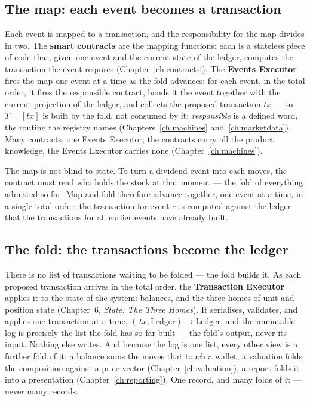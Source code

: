 \documentclass[11pt,a4paper]{article}
\begin{document}
\subsection{The map: each event becomes a transaction}

Each event is mapped to a transaction, and the responsibility for the map divides in two.
The \textbf{smart contracts} are the mapping functions: each is a stateless piece of code
that, given one event and the current state of the ledger, computes the transaction the
event requires (Chapter~\ref{ch:contracts}). The \textbf{Events Executor} fires the map
one event at a time as the fold advances: for each event, in the total order, it fires the
responsible contract, hands it the event together with the current projection of the
ledger, and collects the proposed transaction $tx$ --- so $T=[tx]$ is built by the fold,
not consumed by it; \emph{responsible} is a defined word, the routing the registry names
(Chapters~\ref{ch:machines} and~\ref{ch:marketdata}). Many contracts, one Events Executor; the contracts carry all the
product knowledge, the Events Executor carries none (Chapter~\ref{ch:machines}).

The map is not blind to state. To turn a dividend event into cash moves, the contract
must read who holds the stock at that moment --- the fold of everything admitted so far.
Map and fold therefore advance together, one event at a time, in a single total order:
the transaction for event $e$ is computed against the ledger that the transactions for
all earlier events have already built.

\subsection{The fold: the transactions become the ledger}

There is no list of transactions waiting to be folded --- the fold builds it. As each
proposed transaction arrives in the total order, the \textbf{Transaction Executor} applies
it to the state of the system: balances, and the three homes of unit and position state
(Chapter~6, \emph{State: The Three Homes}). It serialises, validates, and applies one
transaction at a time, $(\,tx, \mathrm{Ledger}) \to \mathrm{Ledger}$, and the immutable log
is precisely the list the fold has so far built --- the fold's output, never its input.
Nothing else writes. And because the log is one list, every other view is a further fold of it: a
balance sums the moves that touch a wallet, a valuation folds the composition against a
price vector (Chapter~\ref{ch:valuation}), a report folds it into a presentation
(Chapter~\ref{ch:reporting}). One record, and many folds of it --- never many records.
\end{document}
